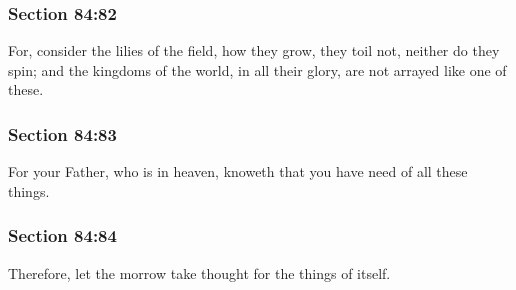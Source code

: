	\subsubsection{Section 84:82} %
		\label{DC84-82}

		For, consider the lilies of the field, how they grow, they toil not, neither do they spin; and the kingdoms of the world, in all their glory, are not arrayed like one of these.


	\subsubsection{Section 84:83} %
		\label{DC84-83}

		For your Father, who is in heaven, knoweth that you have need of all these things.


	\subsubsection{Section 84:84} %
		\label{DC84-84}

		Therefore, let the morrow take thought for the things of itself.


